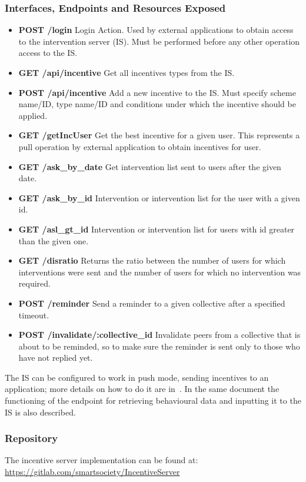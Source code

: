 \subsubsection{Interfaces, Endpoints and Resources Exposed}
\begin{itemize}
\item {\bf POST /login} Login Action. Used by external applications to obtain access to the intervention server (IS). Must be performed before any other operation access to the IS.
\item {\bf GET /api/incentive} Get all incentives types from the IS.
\item {\bf POST /api/incentive} Add a new incentive to the IS. Must specify scheme name/ID, type name/ID and conditions under which the incentive should be applied.
\item {\bf GET /getIncUser} Get the best incentive for a given user. This represents a pull operation by external application to obtain incentives for user.
\item {\bf GET /ask\_by\_date}  Get intervention list sent to users after the given date. 
\item {\bf GET /ask\_by\_id} Intervention or intervention list for the user with a given id.
\item {\bf GET /asl\_gt\_id} Intervention or intervention list for users with id greater than the given one.
\item {\bf GET /disratio} Returns the ratio between the number of users for which interventions were sent and the number of users for which no intervention was required.
\item {\bf POST /reminder} Send a reminder to a given collective after a specified timeout.
\item {\bf POST /invalidate/:collective\_id} Invalidate peers from a collective that is about to be reminded, so to make sure the reminder is sent only to those who have not replied yet.
\end{itemize}
The IS can be configured to work in push mode, sending incentives to an application; more details on how to do it are in~\cite{D5.4}. In the same document the functioning of the endpoint for retrieving behavioural data and inputting it to the IS is also described.
\subsubsection{Repository}
The incentive server implementation can be found at: \url{https://gitlab.com/smartsociety/IncentiveServer}